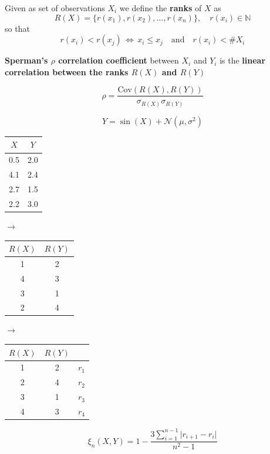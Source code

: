 \documentclass[a4paper, 10pt]{beamer}
\begin{document}
\begin{frame}
  Given as set of observations $X_i$ we define the \textbf{ranks} of $X$ as 
  \begin{equation*}
    R(X) = \{ r(x_1), r(x_2), ..., r(x_n)\}, \quad r(x_i) \in \mathbb{N}
  \end{equation*}
  so that
  \begin{equation*}
    r(x_i) < r(x_j) \, \Leftrightarrow \, x_i \leq x_j\quad \text{and} \quad r(x_i)
    < \#X_i
  \end{equation*}
  
  \textbf{Sperman's $\rho$ correlation coefficient} between $X_i$ and $Y_i$ is the
  \textbf{linear correlation between the ranks $R(X)$ and $R(Y)$}

  \begin{equation*}
    \rho = \frac{\text{Cov}(R(X),R(Y))}{\sigma_{R(X)} \sigma_{R(Y)}}
  \end{equation*}\vspace{10pt}
\end{frame}

\begin{frame}
  \begin{equation*}
    Y = \sin(X) + \mathcal{N}(\mu, \sigma^2)
  \end{equation*}
  \begin{tabular}{c | c}
    $X$ & $Y$\\
    \hline
    0.5 & 2.0 \\
    4.1 & 2.4 \\
    2.7 & 1.5 \\
    2.2 & 3.0
  \end{tabular}
  $\longrightarrow$
  \begin{tabular}{c | c}
    $R(X)$ & $R(Y)$\\
    \hline
     1 & 2\\
     4 & 3\\
     3 & 1\\
     2 & 4
  \end{tabular}
  $\longrightarrow$
  \begin{tabular}{c | c l}
    $R(X)$ & $R(Y)$\\
    \hline
    1 & 2 & \scriptsize{$r_1$}\\
    2 & 4 & \scriptsize{$r_2$}\\
    3 & 1 & \scriptsize{$r_3$}\\
    4 & 3 & \scriptsize{$r_4$}\\
  \end{tabular}
  \begin{equation*}
    \xi_n(X,Y) = 1 - \frac{3 \sum_{i=1}^{n-1}{|r_{i+1}-r_i}|}{n^2 - 1}
  \end{equation*}
\end{frame}
\end{document}
